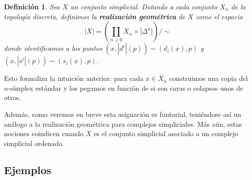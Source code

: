 \documentclass[11pt]{report}
\theoremstyle{colored}
\newtheorem{definition}{Definición}[section]
\renewcommand{\ss}[1]{\Delta^{#1}}
\begin{document}
\begin{definition} Sea $X$ un conjunto simplicial. Dotando a cada conjunto $X_n$ de la topología discreta, definimos la \textbf{realización geométrica} de $X$ como el espacio
\[
|X| = \left(\coprod_{n \geq 0}X_n \times |\ss{n}|\right)\Big/\sim
\]
donde identificamos a los puntos $(x,|d^i|(p)) \sim (d_i(x),p)$ y $(x,|s^i|(p)) \sim (s_i(x),p)$.
\end{definition}

Esto formaliza la intuición anterior: para cada $x \in X_n$ construimos una copia del $n$-símplex estándar y los pegamos en función de si son caras o colapsos unos de otros.

Además, como veremos en breve esta asignación es funtorial, teniéndose así un análogo a la realización geométrica para complejos simpliciales. Más aún, estas nociones coindicen cuando $X$ es el conjunto simplicial asociado a un complejo simplicial ordenado.

\subsection{Ejemplos}
\end{document}
